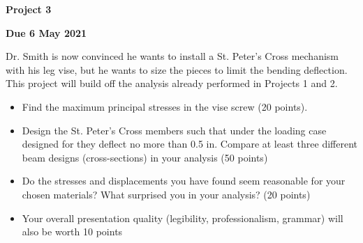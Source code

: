 \documentclass[12pt, oneside]{article}
\begin{document}
\begin{center}
\textbf{\Large Project 3}

\textbf{Due 6 May 2021}
\end{center}

Dr. Smith is now convinced he wants to install a St. Peter's Cross mechanism with his leg vise, but he wants to size the pieces to limit the bending deflection.
This project will build off the analysis already performed in Projects 1 and 2.
\begin{itemize}
  \item Find the maximum principal stresses in the vise screw (20 points).
	\item Design the St. Peter's Cross members such that under the loading case designed for they deflect no more than 0.5 in.
		Compare at least three different beam designs (cross-sections) in your analysis (50 points)
	\item Do the stresses and displacements you have found seem reasonable for your chosen materials? What surprised you in your analysis? (20 points)
	\item Your overall presentation quality (legibility, professionalism, grammar) will also be worth 10 points
\end{itemize}
\end{document}
